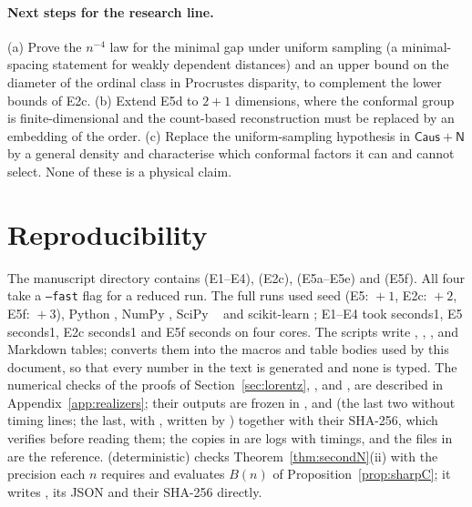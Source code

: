 \documentclass[11pt,a4paper]{article}
\providecommand{\HasLorentz}{0}
\providecommand{\HasClass}{0}
\providecommand{\HasRlaw}{0}
\theoremstyle{plain}
\theoremstyle{definition}
\theoremstyle{remark}
\newcommand{\Fcausn}{\mathsf{Caus}{+}\mathsf{N}}
\begin{document}
\paragraph{Next steps for the research line.} (a) Prove the $n^{-4}$ law for the minimal gap under uniform sampling (a minimal-spacing statement for weakly dependent distances) and an upper bound on the diameter of the ordinal class in Procrustes disparity, to complement the lower bounds of E2c. (b) Extend E5d to $2{+}1$ dimensions, where the conformal group is finite-dimensional and the count-based reconstruction must be replaced by an embedding of the order. (c) Replace the uniform-sampling hypothesis in $\Fcausn$ by a general density and characterise which conformal factors it can and cannot select. None of these is a physical claim.

\appendix
\section{Reproducibility}\label{app:repro}
{\sloppy The manuscript directory contains  (E1--E4),  (E2c),  (E5a--E5e) and  (E5f). All four take a \texttt{--fast} flag for a reduced run. The full runs used seed \MetaSeed{} (E5: \MetaSeed{}${}+1$, E2c: \MetaSeed{}${}+2$, E5f: \MetaSeed{}${}+3$), Python \MetaPython, NumPy \MetaNumpy, SciPy \MetaScipy{}~\citep{virtanen2020} and scikit-learn \MetaSklearn; E1--E4 took \MetaSeconds{} seconds\if\HasLorentz1{}, E5 \EfiveSeconds{} seconds\fi\if\HasClass1{}, E2c \EtwocSeconds{} seconds\fi\if\HasRlaw1{} and E5f \RlawSeconds{} seconds\fi{} on four cores. The scripts write , , ,  and Markdown tables;  converts them into the macros and table bodies used by this document, so that every number in the text is generated and none is typed. The numerical checks of the proofs of Section~\ref{sec:lorentz}, ,  and , are described in Appendix~\ref{app:realizers}; their outputs are frozen in ,  and  (the last two without timing lines; the last, with , written by ) together with their SHA-256, which  verifies before reading them; the copies in  are logs with timings, and the files in  are the reference.  (deterministic) checks Theorem~\ref{thm:secondN}(ii) with the precision each $n$ requires and evaluates $B(n)$ of Proposition~\ref{prop:sharpC}; it writes , its JSON and their SHA-256 directly.\par}
\end{document}
